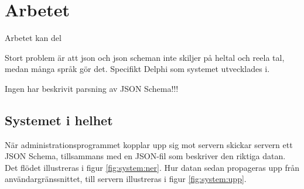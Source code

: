\chapter{Arbetet}
Arbetet kan del


Stort problem är att json och json scheman inte skiljer på heltal och reela tal, medan många språk gör det. Specifikt Delphi som systemet utvecklades i.

Ingen har beskrivit parsning av JSON Schema!!!

\section{Systemet i helhet}

När administrationsprogrammet kopplar upp sig mot servern skickar servern ett JSON Schema, tillsammans med en JSON-fil som beskriver den riktiga datan. Det flödet illustreras i figur \ref{fig:system:ner}. Hur datan sedan propageras upp från användargränssnittet, till servern illustreras i figur \ref{fig:system:upp}.

